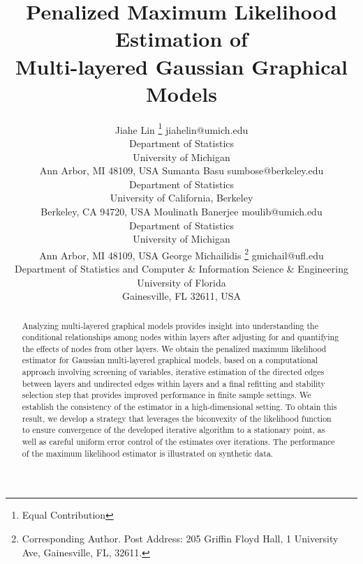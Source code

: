 \documentclass[twoside,11pt]{article}
\newcommand*\samethanks[1][\value{footnote}]{\footnotemark[#1]}
\begin{document}
\title{Penalized Maximum Likelihood Estimation of \\ Multi-layered Gaussian Graphical Models}


\author{\name Jiahe Lin \thanks{Equal Contribution} \email jiahelin@umich.edu \\
       \addr Department of Statistics\\
       University of Michigan\\
       Ann Arbor, MI 48109, USA
       \AND
       \name Sumanta Basu \samethanks \email sumbose@berkeley.edu \\
       \addr Department of Statistics\\
       University of California, Berkeley\\
       Berkeley, CA 94720, USA
       \AND 
       \name Moulinath Banerjee \email moulib@umich.edu \\
       \addr Department of Statistics\\
              University of Michigan\\
              Ann Arbor, MI 48109, USA
      \AND
      \name George Michailidis \thanks{Corresponding Author. Post Address: 205 Griffin Floyd Hall, 1 University Ave, Gainesville, FL, 32611.} \email gmichail@ufl.edu \\
      \addr Department of Statistics and Computer \& Information Science \& Engineering \\
      University of Florida \\
      Gainesville, FL 32611, USA 
       }

\editor{}


\maketitle
\begin{abstract} %
Analyzing multi-layered graphical models provides insight into understanding the conditional relationships among nodes within layers after adjusting for and quantifying the effects of nodes from other layers. We obtain the penalized maximum likelihood estimator for Gaussian multi-layered graphical models, based on a computational approach involving screening of variables, iterative estimation of the directed edges between layers and undirected edges within layers and a final refitting and stability selection step that provides improved performance in finite sample settings. We establish the consistency of the estimator in a high-dimensional setting. To obtain this result, we develop a strategy that leverages the biconvexity of the likelihood function to ensure convergence of the developed iterative algorithm to a stationary point, as well as careful uniform error control of the estimates over iterations.  The performance of the maximum likelihood estimator is illustrated on synthetic data. 
\end{abstract}
\end{document}
